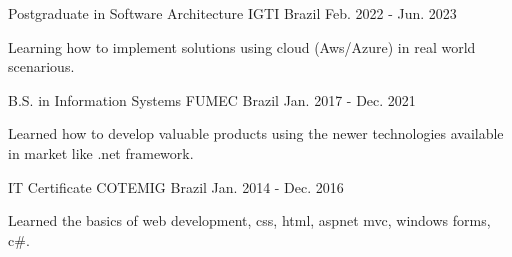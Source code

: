 

\begin{cventries}

  \cventry
    {Postgraduate in Software Architecture} %
    {IGTI} %
    {Brazil} %
    {Feb. 2022 - Jun. 2023} %
    {
      \begin{cvitems} %
        \item {Learning how to implement solutions using cloud (Aws/Azure) in real world scenarious. }
      \end{cvitems}
    }
    
     \cventry
    {B.S. in Information Systems} %
    {FUMEC} %
    {Brazil} %
    {Jan. 2017 - Dec. 2021} %
    {
      \begin{cvitems} %
        \item {Learned how to develop valuable products using the newer technologies available in market like .net framework.}
      \end{cvitems}
    }
    
     \cventry
    {IT Certificate} %
    {COTEMIG} %
    {Brazil} %
    {Jan. 2014 - Dec. 2016} %
    {
      \begin{cvitems} %
        \item {Learned the basics of web development, css, html, aspnet mvc, windows forms, c\#.}
      \end{cvitems}
    }

\end{cventries}
